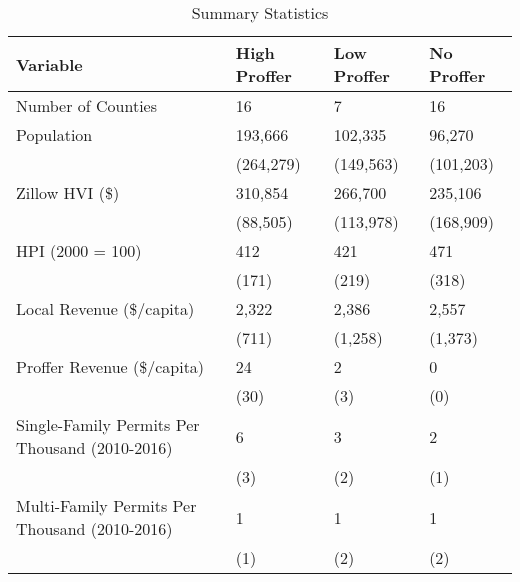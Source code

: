 \begin{table}[ht]
\centering
\begin{tabular}{llll}
  \hline
Variable & High Proffer & Low Proffer & No Proffer \\ 
  \hline
Number of Counties & 16 & 7 & 16 \\ 
  Population & 193,666 & 102,335 & 96,270 \\ 
   & (264,279) & (149,563) & (101,203) \\ 
  Zillow HVI (\$) & 310,854 & 266,700 & 235,106 \\ 
   & (88,505) & (113,978) & (168,909) \\ 
  HPI (2000 = 100) & 412 & 421 & 471 \\ 
   & (171) & (219) & (318) \\ 
  Local Revenue (\$/capita) & 2,322 & 2,386 & 2,557 \\ 
   & (711) & (1,258) & (1,373) \\ 
  Proffer Revenue (\$/capita) & 24 & 2 & 0 \\ 
   & (30) & (3) & (0) \\ 
  Single-Family Permits Per Thousand (2010-2016) & 6 & 3 & 2 \\ 
   & (3) & (2) & (1) \\ 
  Multi-Family Permits Per Thousand (2010-2016) & 1 & 1 & 1 \\ 
   & (1) & (2) & (2) \\ 
   \hline
\end{tabular}
\caption{Summary Statistics} 
\end{table}
